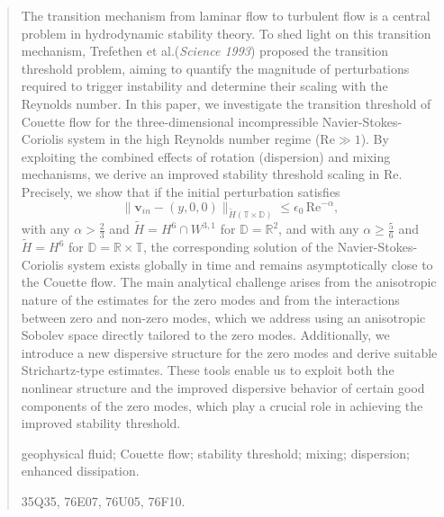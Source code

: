 \documentclass[11pt,reqno]{article}
\numberwithin{equation}{section}
\newcommand\T{{\mathbb T}}
\newcommand\DD{{\mathbb D}}
\newcommand\vv{\bm{v}}
\let\ep=\epsilon
\newcommand{\Rey}{\mathrm{Re}}
\begin{document}
	
\begin{abstract}
        The transition mechanism from laminar flow to turbulent flow is a central problem in hydrodynamic stability theory. To shed light on this transition mechanism, Trefethen et al.({\it \small Science 1993}) proposed the transition threshold problem, aiming to quantify the magnitude of perturbations required to trigger instability and determine their scaling with the Reynolds number. In this paper, we investigate the transition threshold of Couette flow for the three-dimensional incompressible Navier-Stokes-Coriolis system in the high Reynolds number regime ($\Rey\gg 1$). By exploiting the combined effects of  rotation (dispersion) and mixing mechanisms, we derive an improved stability threshold scaling in $\Rey.$\,\,
		Precisely, we show that if the initial perturbation satisfies
		$$\|\vv_{in}-(y, 0, 0)\|_{\tilde{H}(\T\times\DD)}\leq   \ep_0 \,\Rey^{-\alpha},$$ 
		with any $\alpha>\frac 23$ and $\tilde{H}=H^6\cap W^{3,1}$ for $\DD=\mathbb{R}^2$, and with any $\alpha\geq\frac 56$ and $\tilde{H}=H^6$ for $\DD=\mathbb{R}\times\mathbb{T}$,
		the corresponding solution of the Navier-Stokes-Coriolis system exists globally in time and remains asymptotically close to the Couette flow. The main analytical challenge arises from the anisotropic nature of the estimates for the zero modes and from the interactions between zero and non-zero modes, which we address using an anisotropic Sobolev space directly tailored to the zero modes. Additionally, we introduce a new dispersive structure for the zero modes and derive suitable Strichartz-type estimates. These tools enable us to exploit both the nonlinear structure and the improved dispersive behavior of certain good components of the zero modes, which play a crucial role in achieving the improved stability threshold.
        
        \vspace{1em} 
         geophysical fluid; Couette flow; stability threshold; mixing;  dispersion; enhanced dissipation.
        
         35Q35, 76E07, 76U05, 76F10.
\end{abstract}
	
	\setcounter{tocdepth}{2}
	
	\maketitle
	
	
\end{document}
